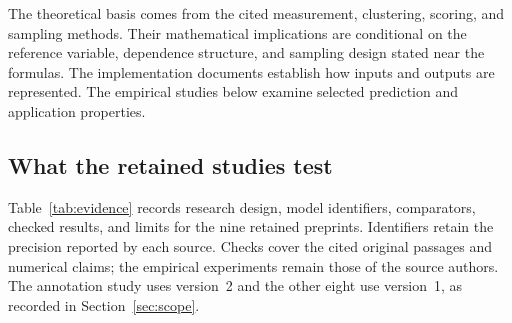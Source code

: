 \documentclass[11pt,a4paper]{article}
\begin{document}
The theoretical basis comes from the cited measurement, clustering, scoring, and sampling methods. Their mathematical implications are conditional on the reference variable, dependence structure, and sampling design stated near the formulas. The implementation documents establish how inputs and outputs are represented. The empirical studies below examine selected prediction and application properties.

\subsection{What the retained studies test}

Table~\ref{tab:evidence} records research design, model identifiers, comparators, checked results, and limits for the nine retained preprints. Identifiers retain the precision reported by each source. Checks cover the cited original passages and numerical claims; the empirical experiments remain those of the source authors. The annotation study uses version~2 and the other eight use version~1, as recorded in Section~\ref{sec:scope}.
\end{document}
